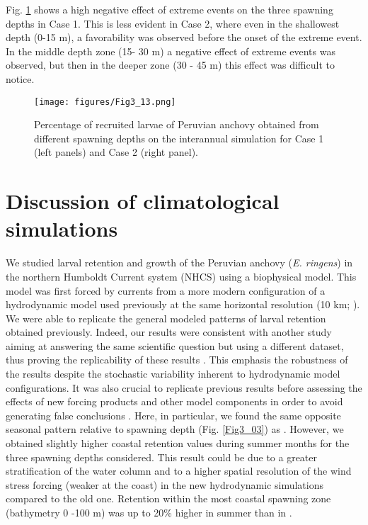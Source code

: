 Fig. \ref{Fig3_13} shows a high negative effect of extreme events on the three spawning depths in Case 1. This is less evident in Case 2, where even in the shallowest depth (0-15 m), a favorability was observed before the onset of the extreme event. In the middle depth zone (15- 30 m) a negative effect of extreme events was observed, but then in the deeper zone (30 - 45 m) this effect was difficult to notice.

\begin{figure}[ht]
	\texttt{[image: figures/Fig3\_13.png]}
	\centering
	\caption{Percentage of recruited larvae of Peruvian anchovy obtained from different spawning depths on the interannual simulation for Case 1 (left panels) and Case 2 (right panel).}
	\label{Fig3_13}
\end{figure}

\section{Discussion of climatological simulations}\label{Chap3Disc1}

We studied larval retention and growth of the Peruvian anchovy (\textit{E. ringens}) in the northern Humboldt Current system (NHCS) using a biophysical model. This model was first forced by currents from a more modern configuration of a hydrodynamic model used previously at the same horizontal resolution (10 km; \cite{BrocLett2008}). We were able to replicate the general modeled patterns of larval retention obtained previously. Indeed, our results were consistent with another study aiming at answering the same scientific question but using a different dataset, thus proving the replicability of these results \citep{NAP25303}. This emphasis the robustness of the results despite the stochastic variability inherent to hydrodynamic model configurations. It was also crucial to replicate previous results before assessing the effects of new forcing products and other model components in order to avoid generating false conclusions \citep{Bake2016}. Here, in particular, we found the same opposite seasonal pattern relative to spawning depth (Fig. \ref{Fig3_03}) as \cite{BrocLett2008}. However, we obtained slightly higher coastal retention values during summer months for the three spawning depths considered. This result could be due to a greater stratification of the water column and to a higher spatial resolution of the wind stress forcing (weaker at the coast) in the new hydrodynamic simulations compared to the old one. Retention within the most coastal spawning zone (bathymetry 0 -100 m) was up to 20\% higher in summer than in \cite{BrocLett2008}.\\

